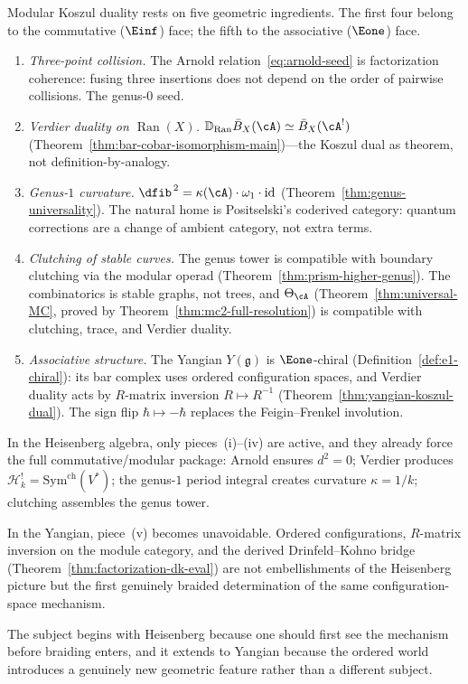 \begin{remark}\label{rem:five-pieces}
Modular Koszul duality rests on five geometric ingredients.
The first four belong to the commutative ($\Einf$) face; the fifth
to the associative ($\Eone$) face.
\begin{enumerate}[label=\textup{(\roman*)}]
\item \emph{Three-point collision.}
  The Arnold relation~\eqref{eq:arnold-seed} is factorization
  coherence: fusing three insertions does not depend on the
  order of pairwise collisions.  The genus-$0$ seed.
\item \emph{Verdier duality on $\operatorname{Ran}(X)$.}
  $\mathbb{D}_{\operatorname{Ran}} \bar{B}_X(\cA) \simeq
  \bar{B}_X(\cA^!)$
  (Theorem~\ref{thm:bar-cobar-isomorphism-main})---the
  Koszul dual as theorem, not definition-by-analogy.
\item \emph{Genus-$1$ curvature.}
  $\dfib^{\,2} = \kappa(\cA) \cdot \omega_1 \cdot
  \operatorname{id}$
  (Theorem~\ref{thm:genus-universality}).  The natural home is
  Positselski's coderived category: quantum corrections are a
  change of ambient category, not extra terms.
\item \emph{Clutching of stable curves.}
  The genus tower is compatible with boundary clutching via the
  modular operad (Theorem~\ref{thm:prism-higher-genus}).
  The combinatorics is stable graphs, not trees, and
  $\Theta_\cA$ (Theorem~\ref{thm:universal-MC},
  proved by Theorem~\ref{thm:mc2-full-resolution})
  is compatible with clutching, trace, and Verdier duality.
\item \emph{Associative structure.}
  The Yangian $Y(\mathfrak{g})$ is $\Eone$-chiral
  (Definition~\ref{def:e1-chiral}): its bar complex uses ordered
  configuration spaces, and Verdier duality acts by $R$-matrix
  inversion $R \mapsto R^{-1}$
  (Theorem~\ref{thm:yangian-koszul-dual}).
  The sign flip $\hbar \mapsto -\hbar$ replaces the Feigin--Frenkel
  involution.
\end{enumerate}

\smallskip\noindent
In the Heisenberg algebra, only pieces~(i)--(iv) are active, and they
already force the full commutative/modular package: Arnold ensures
$d^2 = 0$; Verdier produces
$\mathcal{H}_k^! = \mathrm{Sym}^{\mathrm{ch}}(V^*)$; the genus-$1$
period integral creates curvature $\kappa = 1/k$; clutching assembles
the genus tower.

\smallskip\noindent
In the Yangian, piece~(v) becomes unavoidable.  Ordered
configurations, $R$-matrix inversion on the module category, and the
derived Drinfeld--Kohno bridge
(Theorem~\ref{thm:factorization-dk-eval}) are not embellishments of
the Heisenberg picture but the first genuinely braided determination of
the same configuration-space mechanism.

\smallskip\noindent
The subject begins with Heisenberg because one should first see the
mechanism before braiding enters, and it extends to Yangian because the
ordered world introduces a genuinely new geometric feature rather than
a different subject.
\end{remark}

